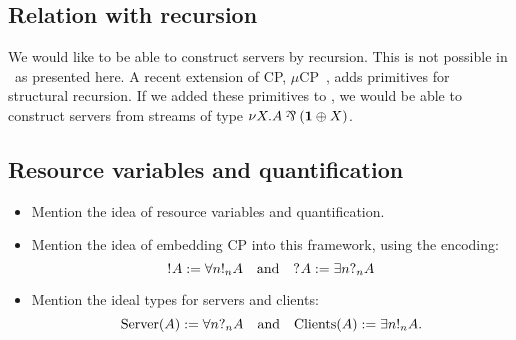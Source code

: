 \documentclass[a4paper,UKenglish]{lipics-v2016}
\begin{document}
\subsection*{Relation with recursion}
We would like to be able to construct servers by recursion. This is not possible
in \nodcap\ as presented here. 
A recent extension of CP, $\mu\text{CP}$~\cite{lindley2016}, adds primitives for
structural recursion. 
If we added these primitives to \nodcap, we would be able to construct servers
from streams of type $\nu X.A \parr (\one \plus X)$.

\subsection*{ Resource variables and quantification}
\begin{itemize}
\item
  Mention the idea of resource variables and quantification.
\item
  Mention the idea of embedding CP into this framework, using the encoding:
  \[
    \take{A} := \forall{n}\take[n]{A}
    \quad\text{and}\quad
    \give{A} := \exists{n}{\give[n]{A}}
  \]
\item
  Mention the ideal types for servers and clients:
  \[
    \text{Server}(A) := \forall{n}\give[n]{A}
    \quad\text{and}\quad
    \text{Clients}(A) := \exists{n}{\take[n]{A}}. 
  \]
\end{itemize}

\clearpage

\end{document}
